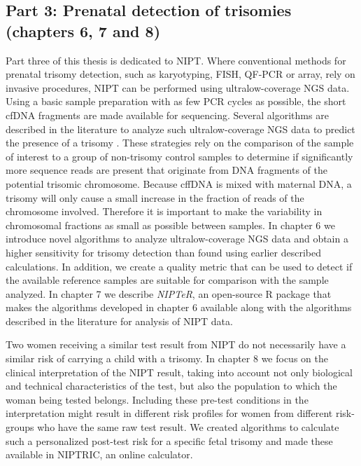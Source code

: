 \subsection[Prenatal detection of trisomies]{Part 3: Prenatal detection of trisomies \newline (chapters 6, 7 and 8)}\label{Part3}
Part three of this thesis is dedicated to NIPT. Where conventional methods for prenatal trisomy detection, such as karyotyping, FISH, QF-PCR or array, rely on invasive procedures, NIPT can be performed using ultralow-coverage NGS data. Using a basic sample preparation with as few PCR cycles as possible, the short cfDNA fragments are made available for sequencing. 
Several algorithms are described in the literature to analyze such ultralow-coverage NGS data to predict the presence of a trisomy \cite{Chiu_2008,Fan_2010,Sehnert_2011}. 
These strategies rely on the comparison of the sample of interest to a group of non-trisomy control samples to determine if significantly more sequence reads are present that originate from DNA fragments of the potential trisomic chromosome. 
Because cffDNA is mixed with maternal DNA, a trisomy will only cause a small increase in the fraction of reads of the chromosome involved. 
Therefore it is important to make the variability in chromosomal fractions as small as possible between samples. 
In chapter 6 we introduce novel algorithms to analyze ultralow-coverage NGS data and obtain a higher sensitivity for trisomy detection than found using earlier described calculations. 
In addition, we create a quality metric that can be used to detect if the available reference samples are suitable for comparison with the sample analyzed. 
In chapter 7 we describe \textsl{NIPTeR}, an open-source R package that makes the algorithms developed in chapter 6 available along with the algorithms described in the literature for analysis of NIPT data. 

Two women receiving a similar test result from NIPT do not necessarily have a similar risk of carrying a child with a trisomy. 
In chapter 8 we focus on the clinical interpretation of the NIPT result, taking into account not only biological and technical characteristics of the test, but also the population to which the woman being tested belongs. 
Including these pre-test conditions in the interpretation might result in different risk profiles for women from different risk-groups who have the same raw test result. 
We created algorithms to calculate such a personalized post-test risk for a specific fetal trisomy and made these available in NIPTRIC, an online calculator. 

